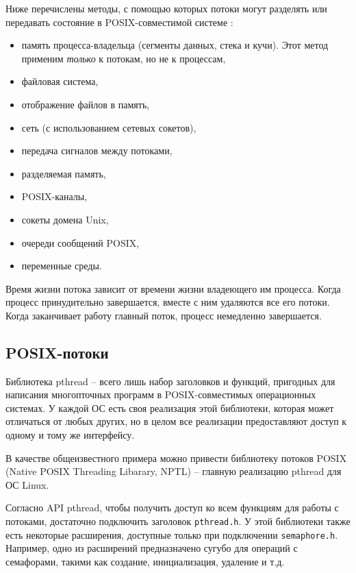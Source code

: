 \documentclass[%
	11pt,
	a4paper,
	utf8,
		]{article}
\begin{document}
Ниже перечислены методы, с помощью которых потоки могут разделять или передавать состояние в POSIX-совместимой системе \cite[]{amini-extreme-c:2022}:
\begin{itemize}
	\item память процесса-владельца (сегменты данных, стека и кучи). Этот метод применим \emph{только} к потокам, но не к процессам,
	
	\item файловая система,
	
	\item отображение файлов в память,
	
	\item сеть (с использованием сетевых сокетов),
	
	\item передача сигналов между потоками,
	
	\item разделяемая память,
	
	\item POSIX-каналы,
	
	\item сокеты домена Unix,
	
	\item очереди сообщений POSIX,
	
	\item переменные среды.
\end{itemize}

Время жизни потока зависит от времени жизни владеющего им процесса. Когда процесс принудительно завершается, вместе с ним удаляются все его потоки. Когда заканчивает работу главный поток, процесс немедленно завершается.

\subsection{POSIX-потоки}

Библиотека pthread -- всего лишь набор заголовков и функций, пригодных для написания многопточных программ в POSIX-совместимых операционных системах. У каждой ОС есть своя реализация этой библиотеки, которая может отличаться от любых других, но в целом все реализации предоставляют доступ к одному и тому же интерфейсу.

В качестве общеизвестного примера можно привести библиотеку потоков POSIX (Native POSIX Threading Libarary, NPTL) -- главную реализацию pthread для ОС Linux.

Согласно API pthread, чтобы получить доступ ко всем функциям для работы с потоками, достаточно подключить заголовок \verb|pthread.h|. У этой библиотеки также есть некоторые расширения, доступные только при подключении \verb|semaphore.h|. Например, одно из расширений предназначено сугубо для операций с семафорами, такими как создание, инициализация, удаление и т.д.
\end{document}
